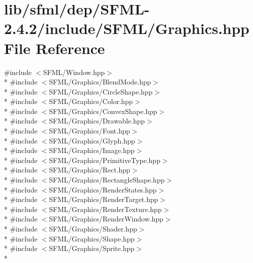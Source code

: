 \hypertarget{sfml_2dep_2_s_f_m_l-2_84_82_2include_2_s_f_m_l_2_graphics_8hpp}{\section{lib/sfml/dep/\-S\-F\-M\-L-\/2.4.2/include/\-S\-F\-M\-L/\-Graphics.hpp File Reference}
\label{sfml_2dep_2_s_f_m_l-2_84_82_2include_2_s_f_m_l_2_graphics_8hpp}
}
{\ttfamily \#include $<$S\-F\-M\-L/\-Window.\-hpp$>$}\\*
{\ttfamily \#include $<$S\-F\-M\-L/\-Graphics/\-Blend\-Mode.\-hpp$>$}\\*
{\ttfamily \#include $<$S\-F\-M\-L/\-Graphics/\-Circle\-Shape.\-hpp$>$}\\*
{\ttfamily \#include $<$S\-F\-M\-L/\-Graphics/\-Color.\-hpp$>$}\\*
{\ttfamily \#include $<$S\-F\-M\-L/\-Graphics/\-Convex\-Shape.\-hpp$>$}\\*
{\ttfamily \#include $<$S\-F\-M\-L/\-Graphics/\-Drawable.\-hpp$>$}\\*
{\ttfamily \#include $<$S\-F\-M\-L/\-Graphics/\-Font.\-hpp$>$}\\*
{\ttfamily \#include $<$S\-F\-M\-L/\-Graphics/\-Glyph.\-hpp$>$}\\*
{\ttfamily \#include $<$S\-F\-M\-L/\-Graphics/\-Image.\-hpp$>$}\\*
{\ttfamily \#include $<$S\-F\-M\-L/\-Graphics/\-Primitive\-Type.\-hpp$>$}\\*
{\ttfamily \#include $<$S\-F\-M\-L/\-Graphics/\-Rect.\-hpp$>$}\\*
{\ttfamily \#include $<$S\-F\-M\-L/\-Graphics/\-Rectangle\-Shape.\-hpp$>$}\\*
{\ttfamily \#include $<$S\-F\-M\-L/\-Graphics/\-Render\-States.\-hpp$>$}\\*
{\ttfamily \#include $<$S\-F\-M\-L/\-Graphics/\-Render\-Target.\-hpp$>$}\\*
{\ttfamily \#include $<$S\-F\-M\-L/\-Graphics/\-Render\-Texture.\-hpp$>$}\\*
{\ttfamily \#include $<$S\-F\-M\-L/\-Graphics/\-Render\-Window.\-hpp$>$}\\*
{\ttfamily \#include $<$S\-F\-M\-L/\-Graphics/\-Shader.\-hpp$>$}\\*
{\ttfamily \#include $<$S\-F\-M\-L/\-Graphics/\-Shape.\-hpp$>$}\\*
{\ttfamily \#include $<$S\-F\-M\-L/\-Graphics/\-Sprite.\-hpp$>$}\\*
